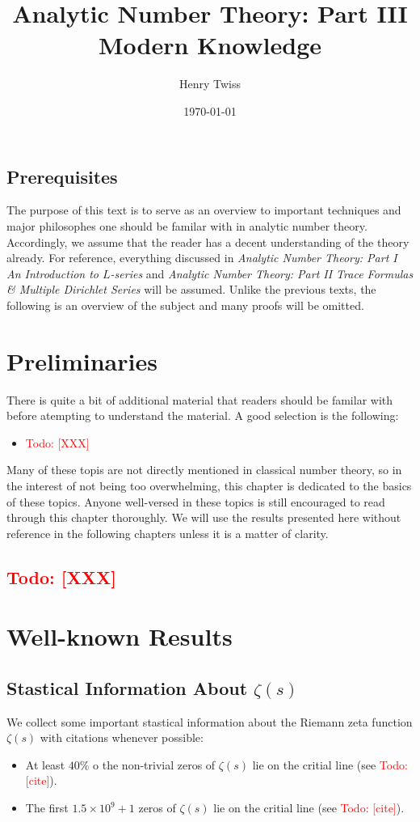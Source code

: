 \documentclass[12pt]{book}
\title{Analytic Number Theory: Part III \\ Modern Knowledge}
\author{Henry Twiss}
\date{\today}
\theoremstyle{definition}\newframedtheorem{method}{Method}
\newcommand{\z}{\zeta}
\newcommand{\x}{\times}
\newcommand{\<}{\langle}
\renewcommand{\>}{\rangle}
\newcommand{\todo}[1]{\textcolor{red}{\sf Todo: [#1]}}
\begin{document}
\maketitle
\thispagestyle{fancy}

\newpage

\section*{Prerequisites}
  The purpose of this text is to serve as an overview to important techniques and major philosophes one should be familar with in analytic number theory. Accordingly, we assume that the reader has a decent understanding of the theory already. For reference, everything discussed in \textit{Analytic Number Theory: Part I An Introduction to $L$-series} and \textit{Analytic Number Theory: Part II Trace Formulas \& Multiple Dirichlet Series} will be assumed. Unlike the previous texts, the following is an overview of the subject and many proofs will be omitted.

\newpage

\tableofcontents

\newpage

\chapter{Preliminaries}
  There is quite a bit of additional material that readers should be familar with before atempting to understand the material. A good selection is the following:
  \begin{itemize}
    \item \todo{XXX}
  \end{itemize}
  Many of these topis are not directly mentioned in classical number theory, so in the interest of not being too overwhelming, this chapter is dedicated to the basics of these topics. Anyone well-versed in these topics is still encouraged to read through this chapter thoroughly. We will use the results presented here without reference in the following chapters unless it is a matter of clarity.
  \section{\todo{XXX}}
\chapter{Well-known Results}
  \section{Stastical Information About \texorpdfstring{$\z(s)$}{z(s)}}
    We collect some important stastical information about the Riemann zeta function $\z(s)$ with citations whenever possible:
    \begin{itemize}
      \item At least $40\%$ o the non-trivial zeros of $\z(s)$ lie on the critial line (see \todo{cite}).
      \item The first $1.5 \x 10^{9}+1$ zeros of $\z(s)$ lie on the critial line (see \todo{cite}).
    \end{itemize}
\end{document}
